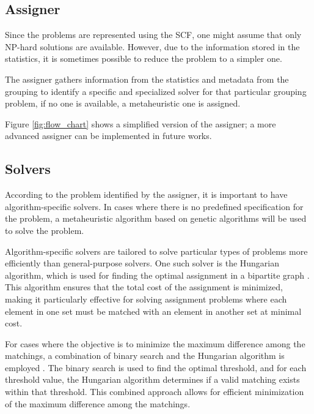     

    \subsection{Assigner}
        Since the problems are represented using the SCF, one might assume that only NP-hard solutions are available. However, due to the information stored in the statistics, it is sometimes possible to reduce the problem to a simpler one.

        The assigner gathers information from the statistics and metadata from the grouping to identify a specific and specialized solver for that particular grouping problem, if no one is available, a metaheuristic one is assigned.

        Figure \ref{fig:flow_chart} shows a simplified version of the assigner; a more advanced assigner can be implemented in future works.

        

    \subsection{Solvers}
    
        According to the problem identified by the assigner, it is important to have algorithm-specific solvers. In cases where there is no predefined specification for the problem, a metaheuristic algorithm based on genetic algorithms will be used to solve the problem.

        Algorithm-specific solvers are tailored to solve particular types of problems more efficiently than general-purpose solvers. One such solver is the Hungarian algorithm, which is used for finding the optimal assignment in a bipartite graph \cite{kuhn1955hungarian}. This algorithm ensures that the total cost of the assignment is minimized, making it particularly effective for solving assignment problems where each element in one set must be matched with an element in another set at minimal cost.

        For cases where the objective is to minimize the maximum difference among the matchings, a combination of binary search and the Hungarian algorithm is employed \cite{land1974automatic}. The binary search is used to find the optimal threshold, and for each threshold value, the Hungarian algorithm determines if a valid matching exists within that threshold. This combined approach allows for efficient minimization of the maximum difference among the matchings.


